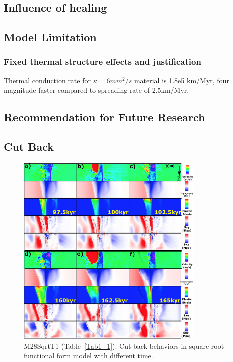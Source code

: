 \subsection{Influence of healing}
\subsection{Model Limitation}
\subsubsection{Fixed thermal structure effects and justification}
Thermal conduction rate for $\kappa=6mm^{2}/s$ material is 1.8e5 km/Myr, four magnitude faster compared to spreading rate of 2.5km/Myr.

\subsection{Recommendation for Future Research}











\iffalse
\subsection{Cut Back}\label{Sec_CutBack}

\begin{figure}[h]
  \centering
    \includegraphics[width=0.8\textwidth]{./Figures/fig_Results4_4_sqrt_cut_back_with_time.eps}
  \caption{M28SqrtT1 (Table~\hyperref[Tab1_1]{\ref{Tab1_1}}). Cut back behaviors in square root functional form model with different time.}
 \label{fig_Results4_4}
\end{figure}   

